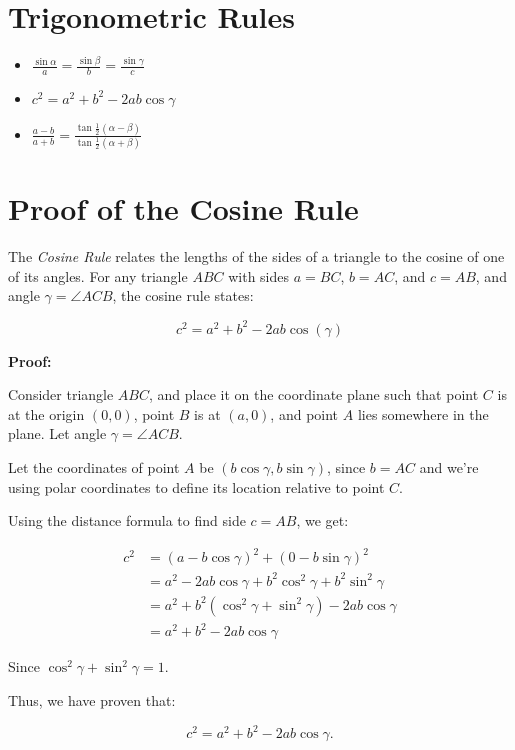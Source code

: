 \section{Trigonometric Rules}

\begin{itemize}

    \item \(\frac{\sin \alpha}{a} = \frac{\sin \beta}{b} = \frac{\sin \gamma}{c}\)

    \item \(c^2 = a^2 + b^2 - 2ab \cos \gamma\)

    \item \(\frac{a - b}{a + b} = \frac{\tan \frac{1}{2}(\alpha - \beta)}{\tan \frac{1}{2} (\alpha + \beta)}\)

\end{itemize}

\section{Proof of the Cosine Rule}

The \emph{Cosine Rule} relates the lengths of the sides of a triangle to the cosine of one of its angles. 
For any triangle \( ABC \) with sides \( a = BC \), \( b = AC \), and \( c = AB \), and angle 
\( \gamma = \angle ACB \), the cosine rule states:

\[
    c^2 = a^2 + b^2 - 2ab\cos(\gamma)
\]

\textbf{Proof:}

Consider triangle \( ABC \), and place it on the coordinate plane such that point \(C\) is at the origin
\( (0,0) \), point \(B\) is at \( (a,0) \), and point \(A\) lies somewhere in the plane. 
Let angle \( \gamma = \angle ACB \).

Let the coordinates of point \(A\) be \( (b\cos\gamma, b\sin\gamma) \), since \( b = AC \) and we’re 
using polar coordinates to define its location relative to point \(C\).

Using the distance formula to find side \( c = AB \), we get:

\begin{align*}
    c^2 &= {(a - b\cos\gamma)}^2 + {(0 - b\sin\gamma)}^2 \\
    &= a^2 - 2ab\cos\gamma + b^2\cos^2\gamma + b^2\sin^2\gamma \\
    &= a^2 + b^2(\cos^2\gamma + \sin^2\gamma) - 2ab\cos\gamma \\
    &= a^2 + b^2 - 2ab\cos\gamma
\end{align*}

Since \( \cos^2\gamma + \sin^2\gamma = 1 \).

Thus, we have proven that:

\[
    c^2 = a^2 + b^2 - 2ab\cos\gamma.
\]

\QED

